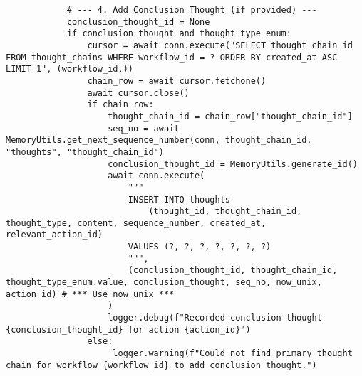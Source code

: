 \documentclass[12pt,a4paper]{article}
\begin{document}
\begin{pageablecode}
\begin{verbatim}
            # --- 4. Add Conclusion Thought (if provided) ---
            conclusion_thought_id = None
            if conclusion_thought and thought_type_enum:
                cursor = await conn.execute("SELECT thought_chain_id FROM thought_chains WHERE workflow_id = ? ORDER BY created_at ASC LIMIT 1", (workflow_id,))
                chain_row = await cursor.fetchone()
                await cursor.close()
                if chain_row:
                    thought_chain_id = chain_row["thought_chain_id"]
                    seq_no = await MemoryUtils.get_next_sequence_number(conn, thought_chain_id, "thoughts", "thought_chain_id")
                    conclusion_thought_id = MemoryUtils.generate_id()
                    await conn.execute(
                        """
                        INSERT INTO thoughts
                            (thought_id, thought_chain_id, thought_type, content, sequence_number, created_at, relevant_action_id)
                        VALUES (?, ?, ?, ?, ?, ?, ?)
                        """,
                        (conclusion_thought_id, thought_chain_id, thought_type_enum.value, conclusion_thought, seq_no, now_unix, action_id) # *** Use now_unix ***
                    )
                    logger.debug(f"Recorded conclusion thought {conclusion_thought_id} for action {action_id}")
                else:
                     logger.warning(f"Could not find primary thought chain for workflow {workflow_id} to add conclusion thought.")


\end{verbatim}
\end{pageablecode}
\end{document}
